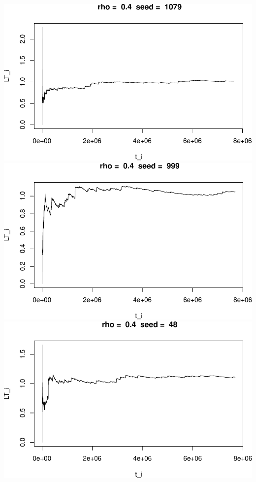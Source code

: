 \documentclass[]{article}
\begin{document}
\includegraphics{003_files/figure-latex/unnamed-chunk-14-4.pdf}
\includegraphics{003_files/figure-latex/unnamed-chunk-14-5.pdf}
\includegraphics{003_files/figure-latex/unnamed-chunk-14-6.pdf}
\end{document}
